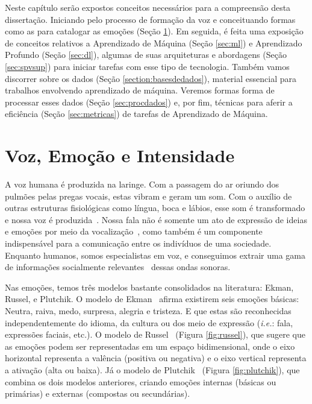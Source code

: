 
Neste capítulo serão expostos conceitos necessários para a compreensão desta dissertação. Iniciando pelo processo de formação da voz e conceituando formas como as para catalogar as emoções (Seção \ref{sec:vozemoint}). Em seguida, é feita uma exposição de conceitos relativos a Aprendizado de Máquina (Seção \ref{sec:ml}) e Aprendizado Profundo (Seção \ref{sec:dl}), algumas de suas arquiteturas e abordagens (Seção \ref{sec:spvsup}) para iniciar tarefas com esse tipo de tecnologia. Também vamos discorrer sobre os dados (Seção \ref{section:basesdedados}), material essencial para trabalhos envolvendo aprendizado de máquina. Veremos formas forma de processar esses dados (Seção \ref{sec:procdados}) e, por fim, técnicas para aferir a eficiência (Seção \ref{sec:metricas}) de tarefas de Aprendizado de Máquina.\\

\section{Voz, Emoção e Intensidade}\label{sec:vozemoint}

A voz humana é produzida na laringe. Com a passagem do ar oriundo dos pulmões pelas pregas vocais, estas vibram e geram um som. Com o auxílio de outras estruturas fisiológicas como língua, boca e lábios, esse som é transformado e nossa voz é produzida~\cite{51}. Nossa fala não é somente um ato de expressão de ideias e emoções por meio da vocalização~\cite{6.31}, como também é um componente indispensável para a comunicação entre os indivíduos de uma sociedade. Enquanto humanos, somos especialistas em voz, e conseguimos extrair uma gama de informações socialmente relevantes~\cite{49} dessas ondas sonoras.

Nas emoções, temos três modelos bastante consolidados na literatura: Ekman, Russel, e Plutchik. O modelo de Ekman~\cite{31.9} afirma existirem seis emoções básicas: Neutra, raiva, medo, surpresa, alegria e tristeza. E que estas são reconhecidas independentemente do idioma, da cultura ou dos meio de expressão (\textit{\textit{i.e.}}: fala, expressões faciais, etc.). O modelo de Russel~\cite{31.10} (Figura \ref{fig:russel}), que sugere que as emoções podem ser representadas em um espaço bidimensional, onde o eixo horizontal representa a valência (positiva ou negativa) e o eixo vertical representa a ativação (alta ou baixa). Já o modelo de Plutchik~\cite{57} (Figura \ref{fig:plutchik}), que combina os dois modelos anteriores, criando emoções internas (básicas ou primárias) e externas (compostas ou secundárias).

